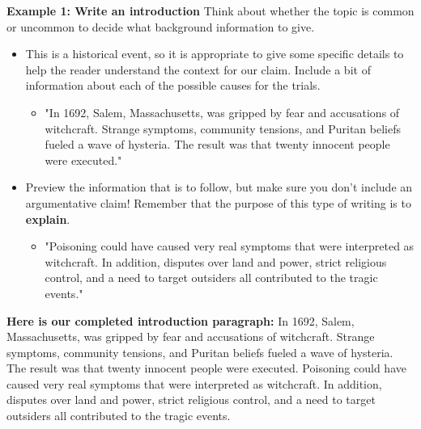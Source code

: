 \documentclass[12pt]{article}
\begin{document}
\begin{tcolorbox}[colframe=black!60, colback=white, 
coltitle=black, colbacktitle=black!15, fonttitle=\bfseries\Large, 
title=Examples, halign title=center, left=10pt, right=10pt, top=10pt, bottom=15pt]

\textbf{Example 1: Write an introduction}
Think about whether the topic is common or uncommon to decide what background information to give.
    \begin{itemize}
        \item This is a historical event, so it is appropriate to give some specific details to help the reader understand the context for our claim. Include a bit of information about each of the possible causes for the trials.
        \begin{itemize}
            \item "In 1692, Salem, Massachusetts, was gripped by fear and accusations of witchcraft. Strange symptoms, community tensions, and Puritan beliefs fueled a wave of hysteria. The result was that twenty innocent people were executed." 



        \end{itemize}


\end{itemize}
\begin{itemize}
    \item Preview the information that is to follow, but make sure you don't include an argumentative claim! Remember that the purpose of this type of writing is to \textbf{explain}.
    \begin{itemize}
        \item "Poisoning could have caused very real symptoms that were interpreted as witchcraft. In addition, disputes over land and power, strict religious control, and a need to target outsiders all contributed to the tragic events." 
    \end{itemize}
\end{itemize}

\textbf{Here is  our completed introduction paragraph:} In 1692, Salem, Massachusetts, was gripped by fear and accusations of witchcraft. Strange symptoms, community tensions, and Puritan beliefs fueled a wave of hysteria. The result was that twenty innocent people were executed. Poisoning could have caused very real symptoms that were interpreted as witchcraft. In addition, disputes over land and power, strict religious control, and a need to target outsiders all contributed to the tragic events.  








     \end{tcolorbox}
\end{document}
